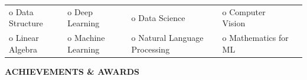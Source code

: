 \documentclass{article}
\begin{document}
\begin{table}[htbp]

\centering
\begin{tabular}{lllll}

  o Data Structure & o Deep Learning &   o  Data Science   &  o Computer Vision  &  \\
o Linear Algebra & o Machine Learning &  o Natural Language Processing  & o Mathematics for ML
\end{tabular}
\end{table}
\vspace{-3.5mm}









  \begin{theorem}
   \vspace{-0.7mm}
\begin{center}
\textbf{ACHIEVEMENTS \& AWARDS
}\end{center}  
\vspace{-0.7mm}    
   \end{theorem}
\vspace{-3mm}
\end{document}
